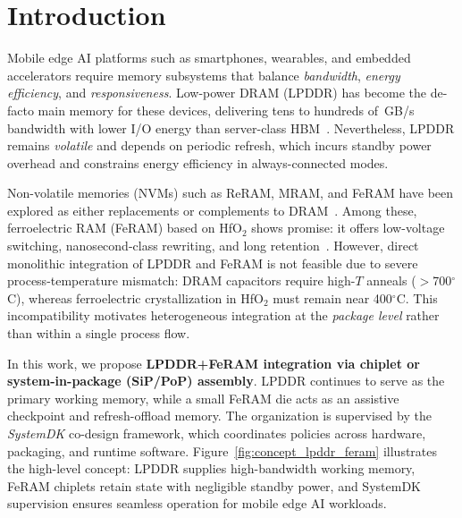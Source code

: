 \section{Introduction}

Mobile edge AI platforms such as smartphones, wearables, and embedded accelerators require memory subsystems that balance
\emph{bandwidth}, \emph{energy efficiency}, and \emph{responsiveness}.
Low-power DRAM (LPDDR) has become the de-facto main memory for these devices, delivering tens to hundreds of~GB/s bandwidth
with lower I/O energy than server-class HBM~\cite{ChoiIEDM2022}.
Nevertheless, LPDDR remains \emph{volatile} and depends on periodic refresh, which incurs standby power overhead
and constrains energy efficiency in always-connected modes.

Non-volatile memories (NVMs) such as ReRAM, MRAM, and FeRAM have been explored as either replacements or complements to DRAM~\cite{NohedaNRM2023,WongProcIEEE2012,IkedaNature2010,WeebitIEDM2022}.
Among these, ferroelectric RAM (FeRAM) based on HfO$_2$ shows promise: it offers low-voltage switching, nanosecond-class rewriting, and long retention~\cite{MullerAPL2011,KimIEDM2021}.
However, direct monolithic integration of LPDDR and FeRAM is not feasible due to severe process-temperature mismatch:
DRAM capacitors require high-$T$ anneals ($>$700$^\circ$C), whereas ferroelectric crystallization in HfO$_2$ must remain near 400$^\circ$C.
This incompatibility motivates heterogeneous integration at the \emph{package level} rather than within a single process flow.

In this work, we propose \textbf{LPDDR+FeRAM integration via chiplet or system-in-package (SiP/PoP) assembly}.
LPDDR continues to serve as the primary working memory, while a small FeRAM die acts as an assistive checkpoint and refresh-offload memory.
The organization is supervised by the \emph{SystemDK} co-design framework, which coordinates policies across hardware, packaging, and runtime software.
Figure~\ref{fig:concept_lpddr_feram} illustrates the high-level concept:
LPDDR supplies high-bandwidth working memory, FeRAM chiplets retain state with negligible standby power,
and SystemDK supervision ensures seamless operation for mobile edge AI workloads.


